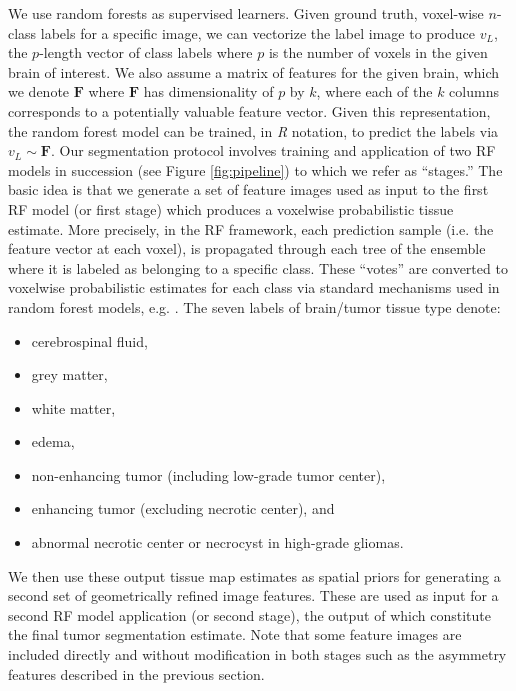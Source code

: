 \documentclass[preprint,authoryear,review,12pt]{elsarticle}
\begin{document}
We use random forests as supervised learners.  Given ground truth,
voxel-wise $n$-class labels for a specific image, we can vectorize the
label image to produce $v_L$, the $p$-length vector of class labels
where $p$ is the number of voxels in the given brain of interest.
We also assume a matrix of features for the given brain, which we
denote $\bm{F}$ where $\bm{F}$ has dimensionality of $p$ by
$k$, where each of the $k$ columns corresponds to a potentially valuable
feature vector.  Given this representation, the random forest model
can be trained, in \textit{R} notation, to predict the labels via
$v_L \sim  \bm{F}$.
Our segmentation protocol involves training and application
of two RF models in succession 
(see Figure \ref{fig:pipeline}) to which we refer as ``stages.''  The basic idea is that
we generate a set of feature images used as input to the
first RF model (or first stage) which produces a voxelwise 
probabilistic tissue estimate.  More precisely, in the RF framework, each prediction sample (i.e. the feature vector at each voxel),
is propagated through each tree of the ensemble where it is labeled as belonging to a specific
class.  
These ``votes'' are converted to voxelwise probabilistic
estimates for each class via standard mechanisms used in random forest
models, e.g. \cite{liaw2002}.
The seven labels of brain/tumor tissue type denote:
\begin{itemize}
\item cerebrospinal fluid,
\item grey matter,
\item white matter,
\item edema, 
\item non-enhancing tumor (including low-grade tumor center), 
\item enhancing tumor (excluding necrotic center), and 
\item abnormal necrotic center or necrocyst in high-grade gliomas.
\end{itemize}
We then use these output tissue map estimates as spatial 
priors for generating a second set of geometrically refined image features.  These
are used as input for a second RF model application (or
second stage),
the output of which constitute the final tumor segmentation estimate.
Note that some feature images are included directly and
  without modification in both stages such as
the asymmetry features described in the previous section.
\end{document}
